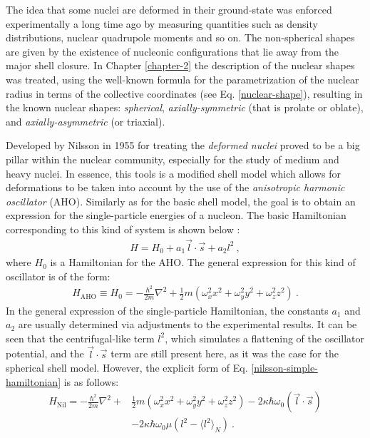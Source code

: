 The idea that some nuclei are deformed in their ground-state was enforced experimentally a long time ago by measuring quantities such as density distributions, nuclear quadrupole moments \cite{casten2000nuclear} and so on. The non-spherical shapes are given by the existence of nucleonic configurations that lie away from the major shell closure. In Chapter \ref{chapter-2} the description of the nuclear shapes was treated, using the well-known formula for the parametrization of the nuclear radius in terms of the collective coordinates (see Eq. \ref{nuclear-shape}), resulting in the known nuclear shapes: \emph{spherical}, \emph{axially-symmetric} (that is prolate or oblate), and \emph{axially-asymmetric} (or triaxial). 

Developed by Nilsson in 1955 \cite{nilsson1955binding} for treating the \emph{deformed nuclei} proved to be a big pillar within the nuclear community, especially for the study of medium and heavy nuclei. In essence, this tools is a modified shell model which allows for deformations to be taken into account by the use of the \emph{anisotropic harmonic oscillator} (AHO). Similarly as for the basic shell model, the goal is to obtain an expression for the single-particle energies of a nucleon. The basic Hamiltonian corresponding to this kind of system is shown below \cite{bertulani2007nuclear}:
\begin{align}
    H=H_0+a_1\vec{l}\cdot\vec{s}+a_2l^2\ ,
    \label{nilsson-simple-hamiltonian}
\end{align}
where $H_0$ is a Hamiltonian for the AHO. The general expression for this kind of oscillator is of the form:
\begin{align}
    H_\text{AHO}\equiv H_0=-\frac{\hbar^2}{2m}\nabla^2+\frac{1}{2}m(\omega_x^2x^2+\omega_y^2y^2+\omega_z^2z^2)\ .
\end{align}
In the general expression of the single-particle Hamiltonian, the constants $a_1$ and $a_2$ are usually determined via adjustments to the experimental results. It can be seen that the centrifugal-like term $l^2$, which simulates a flattening of the oscillator potential, and the $\vec{l}\cdot\vec{s}$ term are still present here, as it was the case for the spherical shell model. However, the explicit form of Eq. \ref{nilsson-simple-hamiltonian} is as follows:
\begin{align}
    H_\text{Nil}=-\frac{\hbar^2}{2m}\nabla^2+&\frac{1}{2}m(\omega_x^2x^2+\omega_y^2y^2+\omega_z^2z^2)-2\kappa\hbar\omega_0(\vec{l}\cdot\vec{s})\nonumber\\&-2\kappa\hbar\omega_0\mu\left(l^2-\langle l^2\rangle_N\right)\ .
\end{align}

